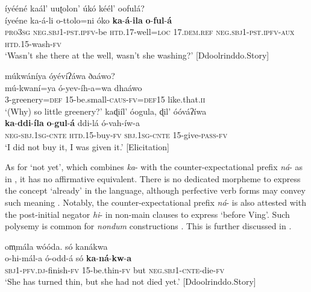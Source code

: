 \documentclass[output=paper,colorlinks=true, citecolor=brown,draftmode]{langscibook}
\begin{document}
\ea\label{ex:cuw:5} íyééné kaál’ uuʈolon’ úkó kéél’ oofulá?  \\
    \gll íyeéne ka-á-li o-ttolo=ni óko \textbf{ka}{}-\textbf{á}{}-\textbf{ila} \textbf{o}{}-\textbf{ful}{}-\textbf{á}\\
          \textsc{pro3sg} \textsc{neg.sbj1}-\textsc{pst.ipfv}{}-be \textsc{htd.17}{}-well=\textsc{loc} 17.\textsc{dem.ref} \textsc{neg.sbj1}-\textsc{pst.ipfv-aux} \textsc{htd.15-}wash-\textsc{fv}\\
    \glt ‘Wasn’t she there at the well, wasn’t she washing?’ [Ddoolrinddo.Story]
\z 

\ea\label{ex:cuw:6}
    \begin{xlist}[A: ]
    \label{ex:cuw:6A} múkwáníya óyévíʔáwa ðaáwo? \\
        \gll  mú-kwaní=ya ó-yev-íh-a=wa dhaáwo\\ 
              3-greenery=\textsc{def} 15-be.small-\textsc{caus-fv}=\textsc{def15} like.that.\textsc{ii} \\ 
        \glt ‘(Why) so little greenery?’
    \label{ex:cuw:6B} kaɖiíl’ óogula, ɖil’ óóváʔíwa\\
        \gll \textbf{ka}{}-\textbf{ddi}{}-\textbf{íla} \textbf{o}{}-\textbf{gul}{}-\textbf{á} ddi{}-lá ó{}-vah{}-íw{}-a\\ 
            \textsc{neg-sbj.1sg-cnte} \textsc{htd.15-}buy-\textsc{fv} \textsc{sbj.1sg-cnte} 15-give-\textsc{pass-fv} \\
        \glt ‘I did not buy it, I was given it.’ [Elicitation]
    \end{xlist}
\z 

As for ‘not yet’, which combines \textit{ka}{}- with the counter-expectational prefix \textit{ná}{}- as in , it has no affirmative equivalent. There is no dedicated morpheme to express the concept ‘already’ in the language, although perfective verb forms may convey such meaning \citep{Guérois2021}. Notably, the counter-expectational prefix \textit{ná}{}- is also attested with the post-initial negator \textit{hi}{}- in non-main clauses to express ‘before Ving’. Such polysemy is common for \textit{nondum} constructions \citep{VeselinovaEtAlFC}. This is further discussed in . 

{\ea\label{ex:cuw:7} om̩mála wóóda. só kanákwa  \\
    \gll o-hi-mál-a ó-odd-á só \textbf{ka}{}-\textbf{ná}{}-\textbf{kw}{}-\textbf{a}\\
          \textsc{sbj1}-\textsc{pfv.dj}{}-finish-\textsc{fv} \textsc{15-}be.thin-\textsc{fv} but \textsc{neg.sbj1}-\textsc{cnte}{}-die-\textsc{fv}\\
    \glt ‘She has turned thin, but she had not died yet.’ [Ddoolrinddo.Story]
\z }
\end{document}
